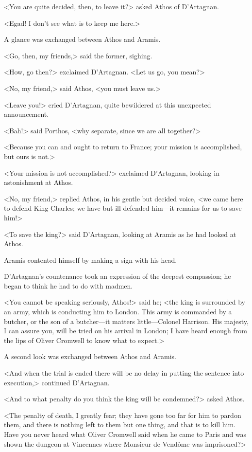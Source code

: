 <You are quite decided, then, to leave it?> asked Athos of D'Artagnan.

<Egad! I don't see what is to keep me here.>

A glance was exchanged between Athos and Aramis.

<Go, then, my friends,> said the former, sighing.

<How, go then?> exclaimed D'Artagnan. <Let us go, you mean?>

<No, my friend,> said Athos, <you must leave us.>

<Leave you!> cried D'Artagnan, quite bewildered at this unexpected announcement.

<Bah!> said Porthos, <why separate, since we are all together?>

<Because you can and ought to return to France; your mission is accomplished, but ours is not.>

<Your mission is not accomplished?> exclaimed D'Artagnan, looking in astonishment at Athos.

<No, my friend,> replied Athos, in his gentle but decided voice, <we came here to defend King Charles; we have but ill defended him—it remains for us to save him!>

<To save the king?> said D'Artagnan, looking at Aramis as he had looked at Athos.

Aramis contented himself by making a sign with his head.

D'Artagnan's countenance took an expression of the deepest compassion; he began to think he had to do with madmen.

<You cannot be speaking seriously, Athos!> said he; <the king is surrounded by an army, which is conducting him to London. This army is commanded by a butcher, or the son of a butcher—it matters little—Colonel Harrison. His majesty, I can assure you, will be tried on his arrival in London; I have heard enough from the lips of Oliver Cromwell to know what to expect.>

A second look was exchanged between Athos and Aramis.

<And when the trial is ended there will be no delay in putting the sentence into execution,> continued D'Artagnan.

<And to what penalty do you think the king will be condemned?> asked Athos.

<The penalty of death, I greatly fear; they have gone too far for him to pardon them, and there is nothing left to them but one thing, and that is to kill him. Have you never heard what Oliver Cromwell said when he came to Paris and was shown the dungeon at Vincennes where Monsieur de Vendôme was imprisoned?>

